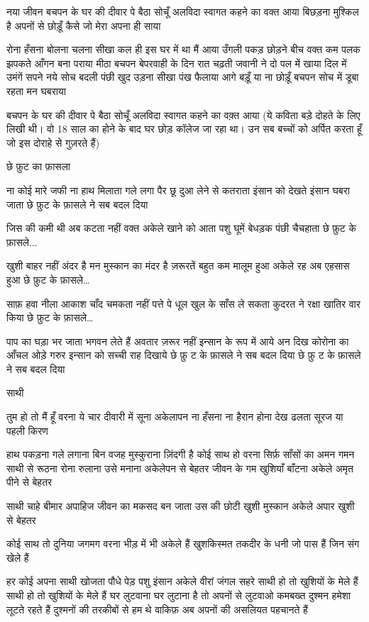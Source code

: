 नया जीवन
बचपन के घर की दीवार पे बैठा सोचूँ
अलविदा स्वागत कहने का वक्त आया
बिछड़ना मुश्किल है अपनों से
छोड़ूँ कैसे जो मेरा अपना ही साया

रोना हँसना बोलना चलना सीखा
कल ही इस घर में था मैं आया
उँगली पकड़ छोड़ने बीच वक्त कम
पलक झपकते आँगन बना पराया
मीठा बचपन बेपरवाही के दिन रात
चढ़ती जवानी ने दो पल में खाया
दिल में उमंगें सपने नये सोच बदली
पंछी खुद उड़ना सीखा पंख फैलाया
आगे बड़ूँ या ना छोड़ूँ बचपन
सोच में डूबा रहता मन घबराया

बचपन के घर की दीवार पे बैठा सोचूँ
अलविदा स्वागत कहने का वक़्त आया
(ये कविता बड़े दोहते के लिए लिखी थी।
वो 18 साल का होने के बाद घर छोड़ कॉलेज
जा रहा था। उन सब बच्चों को अर्पित करता
हूँ जो इस दोराहे से गुज़रते हैं)





छे फ़ुट का फ़ासला

ना कोई मारे जफी ना हाथ मिलाता
गले लगा पैर छू दुआ लेने से कतराता
इंसान को देखते इंसान घबरा जाता
छे फ़ुट के फ़ासले ने सब बदल दिया

जिस की कमी थी अब कटता नहीं
वक्त अकेले खाने को आता
पशु घूमें बेधड़क पंछी चैचहाता
छे फ़ुट के फ़ासले...


खुशी बाहर नहीं अंदर है
मन मुस्कान का मंदर है
ज़रूरतें बहुत कम मालूम हुआ
अकेले रह अब एहसास हुआ
छे फ़ुट के फ़ासले…

साफ़ हवा नीला आकाश
चाँद चमकता नहीं पत्ते पे धूल
खुल के साँस ले सकता
कुदरत ने रक्षा खातिर वार किया
छे फ़ुट के फ़ासले…

पाप का घड़ा भर जाता
भगवन लेते हैं अवतार
ज़रूर नहीं इन्सान के रूप में आये
अन दिख कोरोना का आँचल ओड़े
गरुर इन्सान को सच्ची राह दिखाये
छे फ़ु ट के फ़ासले ने सब बदल दिया
छे फ़ु ट के फ़ासले ने सब बदल दिया


साथी

तुम हो तो मैं हूँ वरना ये
चार दीवारी में सूना अकेलापन
ना हँसना ना हैरान होना देख
ढलता सूरज या पहली किरण

हाथ पकड़ना गले लगाना बिन वजह
मुस्कुराना
ज़िंदगी है कोई साथ हो वरना सिर्फ़
साँसों का अमन गमन
साथी से रूठना रोना रुलाना
उसे मनाना अकेलेपन से बेहतर
जीवन के गम खुशियाँ बाँटना
अकेले अमृत पीने से बेहतर

साथी चाहे बीमार अपाहिज
जीवन का मकसद बन जाता
उस की छोटी खुशी मुस्कान
अकेले अपार खुशी से बेहतर

कोई साथ तो दुनिया जगमग
वरना भीड़ में भी अकेले हैं
खुशकिस्मत तकदीर के धनी
जो पास हैं जिन संग खेले हैं

हर कोई अपना साथी खोजता
पौधे पेड़ पशु इंसान
अकेले वीरां जंगल सहरे
साथी हो तो खुशियों के मेले हैं
साथी हो तो खुशियों के मेले हैं
घर लुटवाना
घर लुटाना है तो अपनों से लुटवाओ
कमबख्त दुश्मन हमेशा लूटते रहते हैं
दुश्मनों की तरकीबों से हम थे वाकिफ़
अब अपनों की असलियत पहचानते हैं


